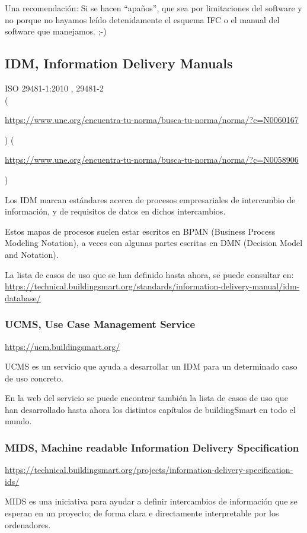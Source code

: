 \documentclass[spanish,10pt,a4paper,final,oneside]{article}
\begin{document}
Una recomendación: Si se hacen ``apaños'', que sea por limitaciones del software y no porque no hayamos leído detenidamente el esquema IFC o el manual del software que manejamos. ;-)

\newpage
\subsection{\textbf{IDM}, Information Delivery Manuals}
ISO 29481-1:2010 , 29481-2 
\\(\begin{tiny}\url{https://www.une.org/encuentra-tu-norma/busca-tu-norma/norma/?c=N0060167}\end{tiny}) (\begin{tiny}\url{https://www.une.org/encuentra-tu-norma/busca-tu-norma/norma/?c=N0058906}\end{tiny})

Los IDM marcan estándares acerca de procesos empresariales de intercambio de información, y de requisitos de datos en dichos intercambios.

Estos mapas de procesos suelen estar escritos en BPMN (Business Process Modeling Notation), a veces con algunas partes escritas en DMN (Decision Model and Notation).

La lista de casos de uso que se han definido hasta ahora, se puede consultar en: \url{https://technical.buildingsmart.org/standards/information-delivery-manual/idm-database/}

\subsubsection{UCMS, Use Case Management Service}
\url{https://ucm.buildingsmart.org/}

UCMS es un servicio que ayuda a desarrollar un IDM para un determinado caso de uso concreto.

En la web del servicio se puede encontrar también la lista de casos de uso que han desarrollado hasta ahora los distintos capítulos de buildingSmart en todo el mundo.

\subsubsection{MIDS, Machine readable Information Delivery Specification}
\url{https://technical.buildingsmart.org/projects/information-delivery-specification-ids/}

MIDS es una iniciativa para ayudar a definir intercambios de información que se esperan en un proyecto; de forma clara e  directamente interpretable por los ordenadores.
\end{document}
